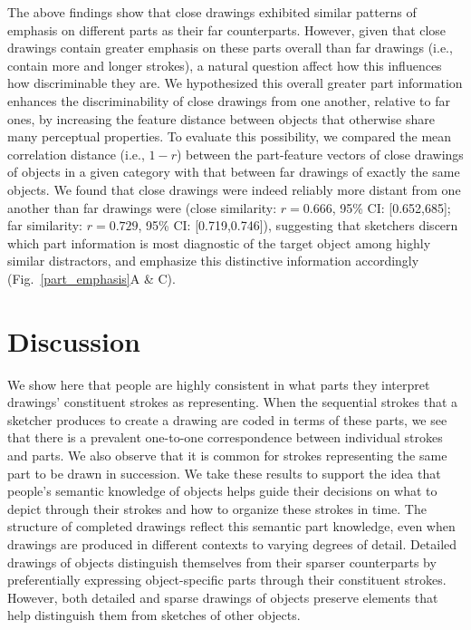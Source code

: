 \documentclass[10pt,letterpaper]{article}
\newcommand{\jefan}[1]{{\color{blue}{[jefan: #1]}}}
\begin{document}
The above findings show that close drawings exhibited similar patterns of emphasis on different parts as their far counterparts. 
However, given that close drawings contain greater emphasis on these parts overall than far drawings (i.e., contain more and longer strokes), a natural question affect how this influences how discriminable they are.
\jefan{Kushin, I think we should report the basic observation that close drawings consist of more strokes and higher arclengths than far, with CIs, around here.}
We hypothesized this overall greater part information enhances the discriminability of close drawings from one another, relative to far ones, by increasing the feature distance between objects that otherwise share many perceptual properties. 
To evaluate this possibility, we compared the mean correlation distance (i.e., $1 - r$) between the part-feature vectors of close drawings of objects in a given category with that between far drawings of exactly the same objects. 
We found that close drawings were indeed reliably more distant from one another than far drawings were (close similarity: $r = 0.666$, 95\% CI: [0.652,685]; far similarity: $r = 0.729$, 95\% CI: [0.719,0.746]), suggesting that sketchers discern which part information is most diagnostic of the target object among highly similar distractors, and emphasize this distinctive information accordingly (Fig.~\ref{part_emphasis}A \& C).

\section{Discussion}

We show here that people are highly consistent in what parts they interpret drawings' constituent strokes as representing. 
When the sequential strokes that a sketcher produces to create a drawing are coded in terms of these parts, we see that there is a prevalent one-to-one correspondence between individual strokes and parts. 
We also observe that it is common for strokes representing the same part to be drawn in succession.
We take these results to support the idea that people's semantic knowledge of objects helps guide their decisions on what to depict through their strokes and how to organize these strokes in time.
The structure of completed drawings reflect this semantic part knowledge, even when drawings are produced in different contexts to varying degrees of detail. Detailed drawings of objects distinguish themselves from their sparser counterparts by preferentially expressing object-specific parts through their constituent strokes. However, both detailed and sparse drawings of objects preserve elements that help distinguish them from sketches of other objects.
\end{document}
